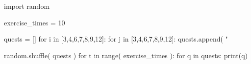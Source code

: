 \documentclass{article}
\begin{document}
\begin{multicols}{6}

\large
{}
\noindent 
\begin{pycode}
import random

exercise_times = 10

quests = []
for i in [3,4,6,7,8,9,12]:
    for j in [3,4,6,7,8,9,12]:
        quests.append( "%

random.shuffle( quests )
for t in range( exercise_times ):
    for q in quests:
        print(q)
    
\end{pycode}
\end{multicols}
\end{document}
